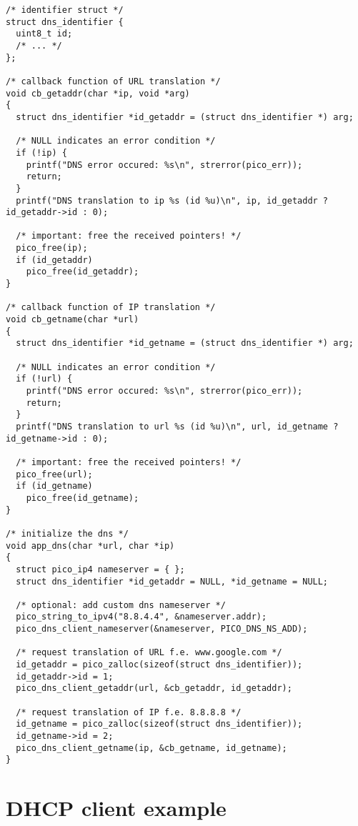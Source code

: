 \begin{verbatim}
/* identifier struct */
struct dns_identifier {
  uint8_t id;
  /* ... */
};

/* callback function of URL translation */
void cb_getaddr(char *ip, void *arg)
{
  struct dns_identifier *id_getaddr = (struct dns_identifier *) arg;
  
  /* NULL indicates an error condition */
  if (!ip) {
    printf("DNS error occured: %s\n", strerror(pico_err));
    return;
  }
  printf("DNS translation to ip %s (id %u)\n", ip, id_getaddr ? id_getaddr->id : 0);
  
  /* important: free the received pointers! */
  pico_free(ip);
  if (id_getaddr)
    pico_free(id_getaddr);
}

/* callback function of IP translation */
void cb_getname(char *url)
{
  struct dns_identifier *id_getname = (struct dns_identifier *) arg;
  
  /* NULL indicates an error condition */
  if (!url) {
    printf("DNS error occured: %s\n", strerror(pico_err));
    return;
  }
  printf("DNS translation to url %s (id %u)\n", url, id_getname ? id_getname->id : 0);
  
  /* important: free the received pointers! */
  pico_free(url);
  if (id_getname)
    pico_free(id_getname);
}

/* initialize the dns */
void app_dns(char *url, char *ip)
{
  struct pico_ip4 nameserver = { };
  struct dns_identifier *id_getaddr = NULL, *id_getname = NULL;
  
  /* optional: add custom dns nameserver */
  pico_string_to_ipv4("8.8.4.4", &nameserver.addr);
  pico_dns_client_nameserver(&nameserver, PICO_DNS_NS_ADD);

  /* request translation of URL f.e. www.google.com */  
  id_getaddr = pico_zalloc(sizeof(struct dns_identifier));
  id_getaddr->id = 1;
  pico_dns_client_getaddr(url, &cb_getaddr, id_getaddr);

  /* request translation of IP f.e. 8.8.8.8 */
  id_getname = pico_zalloc(sizeof(struct dns_identifier));
  id_getname->id = 2;
  pico_dns_client_getname(ip, &cb_getname, id_getname);
}
\end{verbatim}


\section{DHCP client example}

